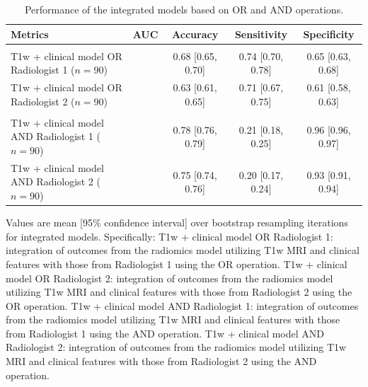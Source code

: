 \begin{table}[htbp]
	\caption{Performance of the integrated models based on OR and AND operations.}
	\label{tab:ch2_integrated}
	\footnotesize
	\setlength{\tabcolsep}{4pt}
	\begin{tabular}{@{}>{\raggedright\arraybackslash}p{3.3cm}cccc@{}}
		\toprule
		\textbf{Metrics} & \textbf{AUC} & \textbf{Accuracy} & \textbf{Sensitivity} & \textbf{Specificity} \\
		\midrule
		\multicolumn{5}{@{}l}{\textit{\textbf{OR operation}}} \\
		T1w + clinical model OR Radiologist 1 ($n = 90$) & \NA & 0.68 [0.65, 0.70] & 0.74 [0.70, 0.78] & 0.65 [0.63, 0.68] \\
		T1w + clinical model OR Radiologist 2 ($n = 90$) & \NA & 0.63 [0.61, 0.65] & 0.71 [0.67, 0.75] & 0.61 [0.58, 0.63] \\
		\midrule
		\multicolumn{5}{@{}l}{\textit{\textbf{AND operation}}} \\
		T1w + clinical model AND Radiologist 1 ($n = 90$) & \NA & 0.78 [0.76, 0.79] & 0.21 [0.18, 0.25] & 0.96 [0.96, 0.97] \\
		T1w + clinical model AND Radiologist 2 ($n = 90$) & \NA & 0.75 [0.74, 0.76] & 0.20 [0.17, 0.24] & 0.93 [0.91, 0.94] \\
		\bottomrule
	\end{tabular}

	\vspace{2mm}
	\parbox{\textwidth}{\footnotesize Values are mean [95\% confidence interval] over bootstrap resampling iterations for integrated models. Specifically: T1w + clinical model OR Radiologist 1: integration of outcomes from the radiomics model utilizing T1w MRI and clinical features with those from Radiologist 1 using the OR operation. T1w + clinical model OR Radiologist 2: integration of outcomes from the radiomics model utilizing T1w MRI and clinical features with those from Radiologist 2 using the OR operation. T1w + clinical model AND Radiologist 1: integration of outcomes from the radiomics model utilizing T1w MRI and clinical features with those from Radiologist 1 using the AND operation. T1w + clinical model AND Radiologist 2: integration of outcomes from the radiomics model utilizing T1w MRI and clinical features with those from Radiologist 2 using the AND operation.}
\end{table}

